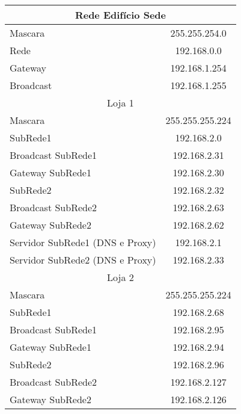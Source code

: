 \documentclass[a4paper,12pt]{article}
\begin{document}
						\begin{table}[ht]
						\centering
						\begin{tabular}{ l | c }
						\toprule
						\multicolumn{2}{c}{Rede Edifício Sede} \\\hline 
						Mascara & 255.255.254.0 \\\hline
						Rede & 192.168.0.0 \\\hline 
						Gateway & 192.168.1.254 \\\hline
						Broadcast & 192.168.1.255 \\\hline 

						\multicolumn{2}{c}{Loja 1} \\\hline 
						Mascara & 255.255.255.224 \\\hline
						
						SubRede1 & 192.168.2.0 \\\hline 
						Broadcast SubRede1 & 192.168.2.31 \\\hline
						Gateway SubRede1 & 192.168.2.30 \\\hline
					
						SubRede2 & 192.168.2.32 \\\hline 
						Broadcast SubRede2 & 192.168.2.63 \\\hline
						Gateway SubRede2 & 192.168.2.62 \\\hline
						
						Servidor SubRede1 (DNS e Proxy) & 192.168.2.1 \\\hline
						Servidor SubRede2 (DNS e Proxy) & 192.168.2.33 \\\hline
						
						\multicolumn{2}{c}{Loja 2} \\\hline 
						Mascara & 255.255.255.224 \\\hline
						
						SubRede1 & 192.168.2.68 \\\hline 
						Broadcast SubRede1 & 192.168.2.95 \\\hline
						Gateway SubRede1 & 192.168.2.94 \\\hline
					
						SubRede2 & 192.168.2.96\\\hline 
						Broadcast SubRede2 & 192.168.2.127 \\\hline
						Gateway SubRede2 & 192.168.2.126\\\hline
						

\end{tabular}
\end{table}
\end{document}
